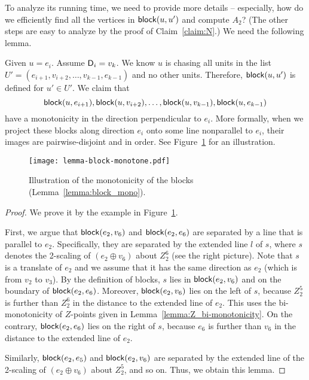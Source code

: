 \documentclass{ws-ijcga}
\begin{document}
To analyze its running time, we need to provide more details -- especially, how do we efficiently find all the vertices in $\mathsf{block}(u,u')$ and compute $A_2$?
(The other steps are easy to analyze by the proof of Claim~\ref{claim:N}.) We need the following lemma.

\begin{lemma}\label{lemma:block_mono}
Given $u=e_i$. Assume $\mathsf{D}_i=v_k$.
We know $u$ is chasing all units in the list $U'=(e_{i+1},v_{i+2},\ldots,v_{k-1},e_{k-1})$ and no other units.
Therefore, $\mathsf{block}(u,u')$ is defined for $u'\in U'$.
We claim that $$\mathsf{block}(u,e_{i+1}),\mathsf{block}(u,v_{i+2}),\ldots,\mathsf{block}(u,v_{k-1}),\mathsf{block}(u,e_{k-1})$$
 have a monotonicity in the direction perpendicular to $e_i$.
  More formally, when we project these blocks along direction $e_i$ onto some line nonparallel to $e_i$, their images are pairwise-disjoint and in order.
  See Figure~\ref{fig:block_mono} for an illustration.
\end{lemma}

\begin{figure}[h]
\centering\texttt{[image: lemma-block-monotone.pdf]}
\caption{Illustration of the monotonicity of the blocks (Lemma~\ref{lemma:block_mono}).}\label{fig:block_mono}
\end{figure}

\begin{proof}
We prove it by the example in Figure~\ref{fig:block_mono}.

First, we argue that $\mathsf{block}(e_2,v_6)$ and $\mathsf{block}(e_2,e_6)$ are separated by a line that is parallel to $e_2$.
Specifically, they are separated by the extended line $l$ of $s$, where $s$ denotes the 2-scaling of $(e_2\oplus v_6)$ about $Z_2^6$ (see the right picture).
Note that $s$ is a translate of $e_2$ and we assume that it has the same direction as $e_2$ (which is from $v_2$ to $v_3$).
By the definition of blocks, $s$ lies in $\mathsf{block}(e_2,v_6)$ and on the boundary of $\mathsf{block}(e_2,e_6)$.
Moreover, $\mathsf{block}(e_2,v_6)$ lies on the left of $s$, because $Z_2^5$ is further than $Z_2^6$ in the distance to the extended line of $e_2$.
  This uses the bi-monotonicity of $Z$-points given in Lemma~\ref{lemma:Z_bi-monotonicity}.
On the contrary, $\mathsf{block}(e_2,e_6)$ lies on the right of $s$, because $e_6$ is further than $v_6$ in the distance to the extended line of $e_2$.

Similarly, $\mathsf{block}(e_2,e_5)$ and $\mathsf{block}(e_2,v_6)$ are separated by the extended line of the 2-scaling of $(e_2\oplus v_6)$ about $Z_2^5$, and so on.
Thus, we obtain this lemma.
 \end{proof}
\end{document}
